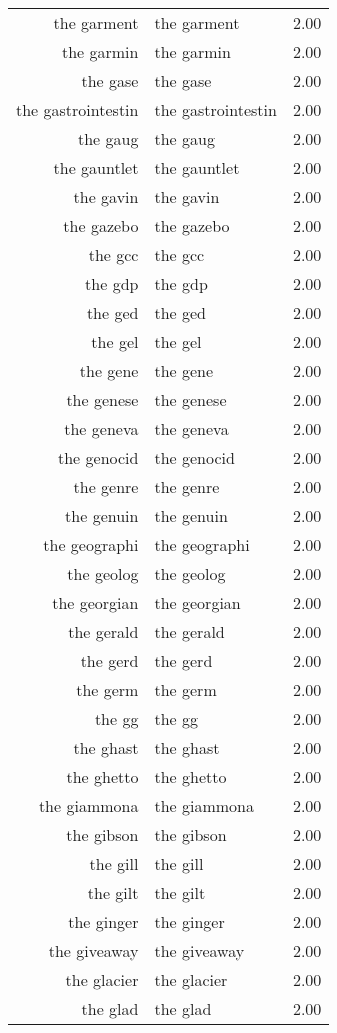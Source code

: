 \begin{table}[ht]
\begin{tabular}{rlr}
  the garment & the garment & 2.00 \\ 
  the garmin & the garmin & 2.00 \\ 
  the gase & the gase & 2.00 \\ 
  the gastrointestin & the gastrointestin & 2.00 \\ 
  the gaug & the gaug & 2.00 \\ 
  the gauntlet & the gauntlet & 2.00 \\ 
  the gavin & the gavin & 2.00 \\ 
  the gazebo & the gazebo & 2.00 \\ 
  the gcc & the gcc & 2.00 \\ 
  the gdp & the gdp & 2.00 \\ 
  the ged & the ged & 2.00 \\ 
  the gel & the gel & 2.00 \\ 
  the gene & the gene & 2.00 \\ 
  the genese & the genese & 2.00 \\ 
  the geneva & the geneva & 2.00 \\ 
  the genocid & the genocid & 2.00 \\ 
  the genre & the genre & 2.00 \\ 
  the genuin & the genuin & 2.00 \\ 
  the geographi & the geographi & 2.00 \\ 
  the geolog & the geolog & 2.00 \\ 
  the georgian & the georgian & 2.00 \\ 
  the gerald & the gerald & 2.00 \\ 
  the gerd & the gerd & 2.00 \\ 
  the germ & the germ & 2.00 \\ 
  the gg & the gg & 2.00 \\ 
  the ghast & the ghast & 2.00 \\ 
  the ghetto & the ghetto & 2.00 \\ 
  the giammona & the giammona & 2.00 \\ 
  the gibson & the gibson & 2.00 \\ 
  the gill & the gill & 2.00 \\ 
  the gilt & the gilt & 2.00 \\ 
  the ginger & the ginger & 2.00 \\ 
  the giveaway & the giveaway & 2.00 \\ 
  the glacier & the glacier & 2.00 \\ 
  the glad & the glad & 2.00 \\ 

\end{tabular}
\end{table}
